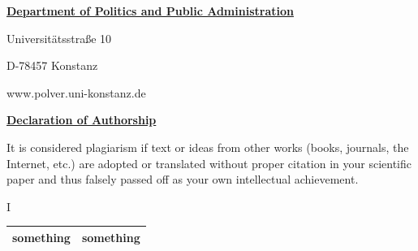 \documentclass[a4paper,10pt,xcolor=dvipsnames]{article}
\begin{document}

\setlength{\parindent}{0cm}
\myhelvetica

\thispagestyle{page1}

{
    \raggedleft
    \small

    \textbf{\normalsize\ul{Department of Politics and Public Administration}}

    \scriptsize
    \vspace{0.4cm}

    Universitätsstraße 10

    D-78457 Konstanz

    \vspace{0.2cm}

    www.polver.uni-konstanz.de

}

\vspace{0.25cm}

{\large{\textbf{\ul{Declaration of Authorship}}}}

\raggedright
\vspace{0.5cm}

It is considered plagiarism if text or ideas from other works (books, journals, the Internet, etc.) are adopted or translated without proper citation in your scientific paper and thus falsely passed off as your own intellectual achievement.

\vspace{0.5cm}

\begin{minipage}{0.05\textwidth}
    I
\end{minipage}\begin{minipage}{0.95\textwidth}
        \begin{tabularx}{\textwidth}{X|X|}
            \hline
        something & something\\
        \hline
        \end{tabularx}

\end{minipage}
\end{document}

